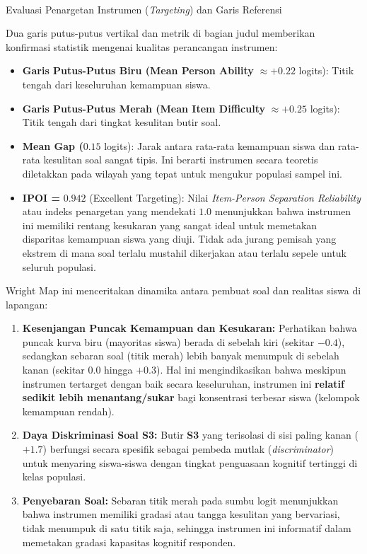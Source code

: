 \documentclass[
]{article}
\makeatletter
\let\oldparagraph\paragraph
\renewcommand{\paragraph}{
    \@ifstar
      \xxxParagraphStar
      \xxxParagraphNoStar
  }
\newcommand{\xxxParagraphStar}[1]{\oldparagraph*{#1}\mbox{}}
\newcommand{\xxxParagraphNoStar}[1]{\oldparagraph{#1}\mbox{}}
\makeatother
\begin{document}
\paragraph{\texorpdfstring{Evaluasi Penargetan Instrumen
(\emph{Targeting}) dan Garis
Referensi}{Evaluasi Penargetan Instrumen (Targeting) dan Garis Referensi}}\label{evaluasi-penargetan-instrumen-targeting-dan-garis-referensi}

Dua garis putus-putus vertikal dan metrik di bagian judul memberikan
konfirmasi statistik mengenai kualitas perancangan instrumen:

\begin{itemize}
\item
  \textbf{Garis Putus-Putus Biru (Mean Person Ability} \(\approx +0.22\)
  logits): Titik tengah dari keseluruhan kemampuan siswa.
\item
  \textbf{Garis Putus-Putus Merah (Mean Item Difficulty}
  \(\approx +0.25\) logits): Titik tengah dari tingkat kesulitan butir
  soal.
\item
  \textbf{Mean Gap (}\(0.15\) logits): Jarak antara rata-rata kemampuan
  siswa dan rata-rata kesulitan soal sangat tipis. Ini berarti instrumen
  secara teoretis diletakkan pada wilayah yang tepat untuk mengukur
  populasi sampel ini.
\item
  \textbf{IPOI =} \(0.942\) (Excellent Targeting): Nilai
  \emph{Item-Person Separation Reliability} atau indeks penargetan yang
  mendekati \(1.0\) menunjukkan bahwa instrumen ini memiliki rentang
  kesukaran yang sangat ideal untuk memetakan disparitas kemampuan siswa
  yang diuji. Tidak ada jurang pemisah yang ekstrem di mana soal terlalu
  mustahil dikerjakan atau terlalu sepele untuk seluruh populasi.
\end{itemize}

Wright Map ini menceritakan dinamika antara pembuat soal dan realitas
siswa di lapangan:

\begin{enumerate}
\def\labelenumi{\arabic{enumi}.}
\item
  \textbf{Kesenjangan Puncak Kemampuan dan Kesukaran:} Perhatikan bahwa
  puncak kurva biru (mayoritas siswa) berada di sebelah kiri (sekitar
  \(-0.4\)), sedangkan sebaran soal (titik merah) lebih banyak menumpuk
  di sebelah kanan (sekitar \(0.0\) hingga \(+0.3\)). Hal ini
  mengindikasikan bahwa meskipun instrumen tertarget dengan baik secara
  keseluruhan, instrumen ini \textbf{relatif sedikit lebih
  menantang/sukar} bagi konsentrasi terbesar siswa (kelompok kemampuan
  rendah).
\item
  \textbf{Daya Diskriminasi Soal S3:} Butir \textbf{S3} yang terisolasi
  di sisi paling kanan (\(+1.7\)) berfungsi secara spesifik sebagai
  pembeda mutlak (\emph{discriminator}) untuk menyaring siswa-siswa
  dengan tingkat penguasaan kognitif tertinggi di kelas populasi.
\item
  \textbf{Penyebaran Soal:} Sebaran titik merah pada sumbu logit
  menunjukkan bahwa instrumen memiliki gradasi atau tangga kesulitan
  yang bervariasi, tidak menumpuk di satu titik saja, sehingga instrumen
  ini informatif dalam memetakan gradasi kapasitas kognitif responden.
\end{enumerate}
\end{document}
